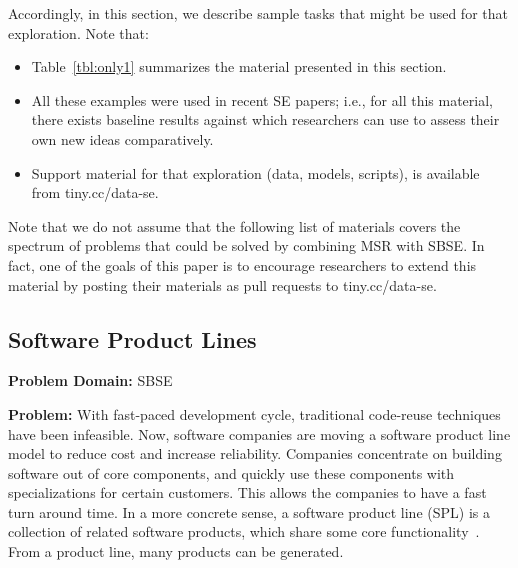 \documentclass[sigconf]{acmart}
\begin{document}
Accordingly, in this section, we describe sample tasks that might be used for that exploration.
Note that:
\begin{itemize}[leftmargin=*]
\item
Table~\ref{tbl:only1} summarizes the material presented in this section. 
\item All these examples were used in recent SE
papers; i.e., for all this material, there exists baseline results against which researchers can use to assess their own new ideas comparatively.
\item
Support material for that exploration (data, models, scripts),
is available from tiny.cc/data-se.

\end{itemize}
Note that we do not assume that the following list of materials
covers the spectrum of problems that could be solved by combining MSR with SBSE. In fact, one of the goals of this paper is to encourage researchers to extend this material by posting their materials as pull requests to tiny.cc/data-se.

    \subsection{Software Product Lines}\label{spl}
    \textbf{Problem Domain: } SBSE
    
    \noindent\textbf{Problem:} With fast-paced development cycle, traditional code-reuse techniques have been infeasible. Now, software companies are moving a software product line model to reduce cost and increase reliability. Companies concentrate on building software out of core components, and quickly use these components with specializations for certain customers. This allows the companies to have a fast turn around time. In a more concrete sense, a software product line (SPL) is a collection of related software products, which share some core functionality~\cite{harman2014search}. From a product line, many products can be generated. 
    
\end{document}
